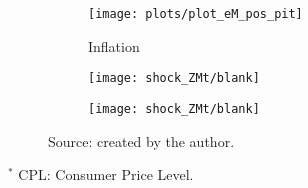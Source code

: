 \documentclass[../thesis.tex]{subfiles}
\begin{document}
\begin{figure}[h!]
\begin{subfigure}[b]{0.27\textwidth}
		\centering
		\texttt{[image: plots/plot\_eM\_pos\_pit]}
		\caption{\scriptsize Inflation}
		\label{fig:ZMt-pit}
	\end{subfigure}
	\hspace*{0.5cm}
	\begin{subfigure}[b]{0.27\textwidth}
		\centering
		\texttt{[image: shock\_ZMt/blank]}
	\end{subfigure}
	\hspace*{0.5cm}
	\begin{subfigure}[b]{0.27\textwidth}
		\centering
		\texttt{[image: shock\_ZMt/blank]}
	\end{subfigure}
	\caption*{Source: created by the author.}
	\label{fig:ZMt-irf2}
\end{figure}

$^{\ast}$ CPL: Consumer Price Level.


\newpage

\end{document}
